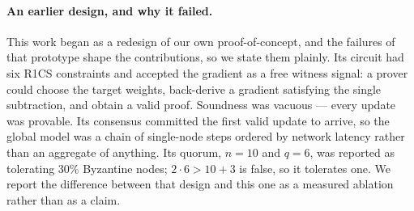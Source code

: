 \documentclass{llncs}
\begin{document}
\paragraph{An earlier design, and why it failed.}
This work began as a redesign of our own proof-of-concept, and the failures of
that prototype shape the contributions, so we state them plainly. Its circuit
had six R1CS constraints and accepted the gradient as a free witness signal: a
prover could choose the target weights, back-derive a gradient satisfying the
single subtraction, and obtain a valid proof. Soundness was vacuous --- every
update was provable. Its consensus committed the first valid update to arrive,
so the global model was a chain of single-node steps ordered by network latency
rather than an aggregate of anything. Its quorum, $n=10$ and $q=6$, was reported
as tolerating 30\% Byzantine nodes; $2 \cdot 6 > 10 + 3$ is false,
so it tolerates one. We report the difference between that design and this one
as a measured ablation rather than as a claim.
\end{document}
